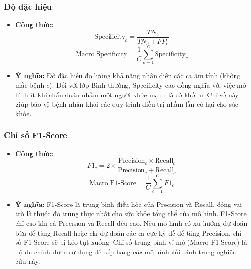 \subsubsection{Độ đặc hiệu}
\begin{itemize}
    \item \textbf{Công thức:}
    \begin{equation}
        \text{Specificity}_c = \frac{TN_c}{TN_c + FP_c}
    \end{equation}
    \begin{equation}
        \text{Macro Specificity} = \frac{1}{C} \sum_{c=1}^{C} \text{Specificity}_c
    \end{equation}
    \item \textbf{Ý nghĩa:} Độ đặc hiệu đo lường khả năng nhận diện các ca âm tính (không mắc bệnh $c$). Đối với lớp Bình thường, Specificity cao đồng nghĩa với việc mô hình ít khi chẩn đoán nhầm một người khỏe mạnh là có khối u. Chỉ số này giúp bảo vệ bệnh nhân khỏi các quy trình điều trị nhầm lẫn có hại cho sức khỏe.
\end{itemize}

\subsubsection{Chỉ số F1-Score}
\begin{itemize}
    \item \textbf{Công thức:}
    \begin{equation}
        F1_c = 2 \times \frac{\text{Precision}_c \times \text{Recall}_c}{\text{Precision}_c + \text{Recall}_c}
    \end{equation}
    \begin{equation}
        \text{Macro F1-Score} = \frac{1}{C} \sum_{c=1}^{C} F1_c
    \end{equation}
    \item \textbf{Ý nghĩa:} F1-Score là trung bình điều hòa của Precision và Recall, đóng vai trò là thước đo trung thực nhất cho sức khỏe tổng thể của mô hình. F1-Score chỉ cao khi cả Precision và Recall đều cao. Nếu mô hình có xu hướng dự đoán bừa để tăng Recall hoặc chỉ dự đoán các ca cực kỳ dễ để tăng Precision, chỉ số F1-Score sẽ bị kéo tụt xuống. Chỉ số trung bình vĩ mô (Macro F1-Score) là độ đo chính được sử dụng để xếp hạng các mô hình đối sánh trong nghiên cứu này.
\end{itemize}

